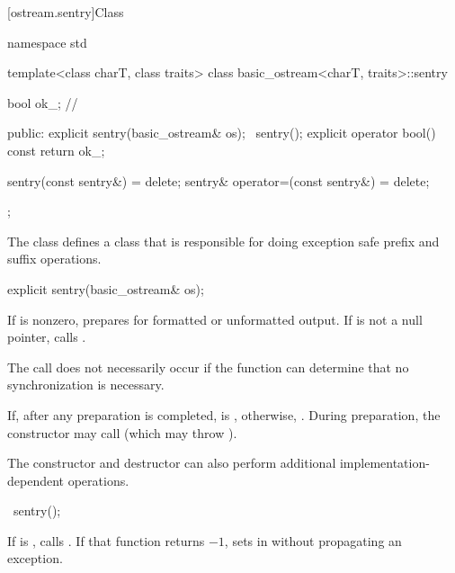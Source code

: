 [ostream.sentry]{Class }

%
%
\begin{codeblock}
namespace std {
  template<class charT, class traits>
  class basic_ostream<charT, traits>::sentry {
    bool ok_;       // \expos

  public:
    explicit sentry(basic_ostream& os);
    ~sentry();
    explicit operator bool() const { return ok_; }

    sentry(const sentry&) = delete;
    sentry& operator=(const sentry&) = delete;
  };
}
\end{codeblock}

\pnum
The class
defines a class that is responsible for doing exception safe prefix and suffix
operations.

%
\begin{itemdecl}
explicit sentry(basic_ostream& os);
\end{itemdecl}

\begin{itemdescr}
\pnum
If
is nonzero, prepares for formatted or unformatted output.
If
is not a null pointer, calls
%
.%
\begin{footnote}
The call
does not necessarily occur if the function can determine that no
synchronization is necessary.
\end{footnote}

\pnum
If, after any preparation is completed,
is
,
otherwise,
.
During preparation, the constructor may call
(which may throw
).
\begin{footnote}
The
constructor and destructor
can also perform additional
%
implementation-dependent operations.
\end{footnote}
\end{itemdescr}

%
\begin{itemdecl}
~sentry();
\end{itemdecl}

\begin{itemdescr}
\pnum
If
is
,
calls
. If that function returns $-1$, sets  in
 without propagating an exception.
\end{itemdescr}

